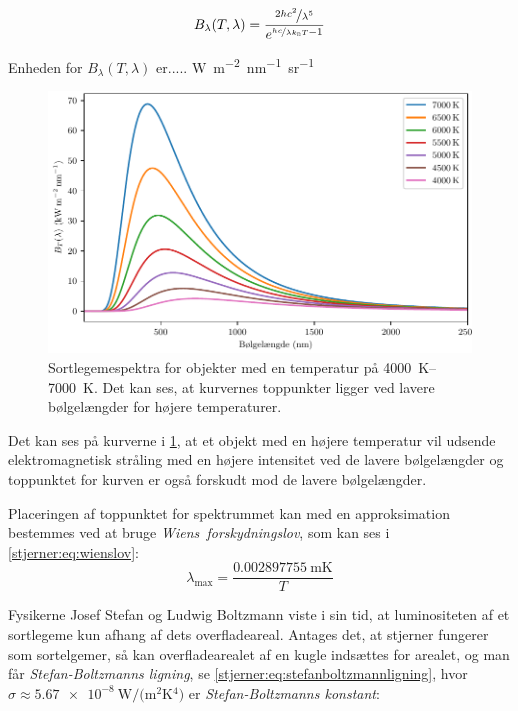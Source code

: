 \documentclass[crop=false, class=memoir]{standalone}
\begin{document}
\begin{equation}\label{stjerner:eq:sortlegemestraaling}
    B_\lambda(T, \lambda) = \frac{\nicefrac{2hc^2}{\lambda^5}}{e^{\nicefrac{hc}{\lambda k_\textsc{b} T} - 1}}
\end{equation}

Enheden for $B_\lambda(T, \lambda)$ er..... \si{\watt\meter^{-2}\nano\meter^{-1}sr^{-1}}

\begin{figure}[H]
    \centering
    \includegraphics{Stjerner/fig/PlanckKurver.pdf}
    \caption{Sortlegemespektra for objekter med en temperatur på \SIrange{4000}{7000}{\kelvin}. Det kan ses, at kurvernes toppunkter ligger ved lavere bølgelængder for højere temperaturer. %
    }
    \label{stjerner:fig:planckkurver}
\end{figure}

Det kan ses på kurverne i \cref{stjerner:fig:planckkurver}, at et objekt med en højere temperatur vil udsende elektromagnetisk stråling med en højere intensitet ved de lavere bølgelængder og toppunktet for kurven er også forskudt mod de lavere bølgelængder.

Placeringen af toppunktet for spektrummet kan med en approksimation bestemmes ved at bruge  \emph{Wiens~forskydningslov}, som kan ses i \cref{stjerner:eq:wienslov}:
\begin{equation}\label{stjerner:eq:wienslov}
    \lambda_\text{max} = \frac{\SI{0.002897755}{\meter\kelvin}}{T}
\end{equation}

Fysikerne Josef Stefan og Ludwig Boltzmann viste i sin tid, at luminositeten af et sortlegeme kun afhang af dets overfladeareal. Antages det, at stjerner fungerer som sortelgemer, så kan overfladearealet af en kugle indsættes for arealet, og man får \emph{Stefan-Boltzmanns ligning}, se \cref{stjerner:eq:stefanboltzmannligning}, hvor $\sigma \approx \SI{5.67e-8}{\watt/(\meter^2\kelvin^4)}$ er \emph{Stefan-Boltzmanns konstant}:
\end{document}

